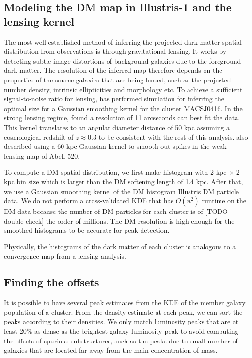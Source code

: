 \subsection{Modeling the DM map in Illustris-1 and the lensing kernel}
The most well established method of inferring the projected dark matter spatial 
distribution from observations is through gravitational lensing.
It works by detecting subtle image distortions of background galaxies due to
the foreground dark matter. The resolution of the inferred map therefore 
depends on the properties of the source galaxies that are being lensed, 
such as the projected number density, 
intrinsic ellipticities and morphology etc.
To achieve a sufficient signal-to-noise ratio for lensing, 
\cite{Hoag2016}  has performed simulation for inferring the optimal size
for a Gaussian smoothing kernel for the cluster MACSJ0416. 
In the strong lensing regime, \cite{Hoag2016} found a resolution of 11 arcseconds
can best fit the data. This kernel translates to an angular diameter distance of 50 
kpc assuming a cosmological redshift of $z \approx 0.3$ to be consistent with
the rest of this analysis. 
\cite{Clowe2012} also described using a 60 kpc Gaussian kernel to smooth out spikes
in the weak lensing map of Abell 520.  

To compute a DM spatial distribution, we first make histogram with 2 kpc
$\times$ 2 kpc bin size which is larger than the DM softening length of 1.4 kpc. 
After that, we use a Gaussian smoothing kernel of the DM histogram Illustris DM
particle data. We do not perform a cross-validated KDE that has
$O(n^2)$ runtime on the DM data because the
number of DM particles for each cluster is of 
[TODO double check] the order of millions. The DM
resolution is high enough for the smoothed histograms to be accurate for peak
detection.  

Physically, the histograms of the dark matter of each cluster 
is analogous to a convergence map from a lensing analysis. 


\subsection{Finding the offsets} \label{subsec:offsets}
It is possible to have several peak estimates from the KDE of the member galaxy 
population of a cluster. 
From the density estimate at each peak, we can sort 
the peaks according to their densities. We only match luminosity 
peaks that are at 
least 20\% as dense as the brightest galaxy-luminosity peak to avoid 
computing the offsets of spurious substructures, such as the peaks due to 
small number of galaxies that are located far away from the main concentration of mass.

